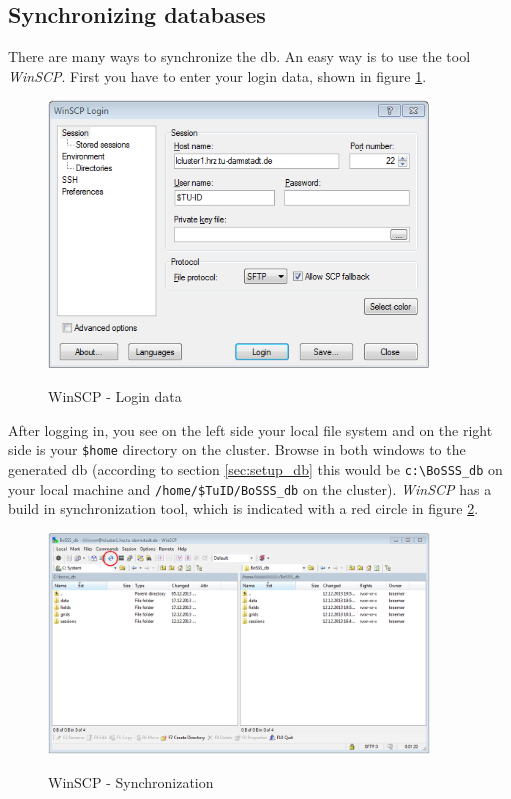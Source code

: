 \documentclass[11pt,twoside,a4paper]{fdyartcl}
\begin{document}
\subsection{Synchronizing databases}
\label{sec:synchronize_db}
There are many ways to synchronize the db. An easy way is to use the tool \emph{WinSCP}. First you have to enter your login data, shown in figure \ref{fig:winscp_login}.
\begin{figure}[htbp] %
  \begin{centering}
  \includegraphics[width=0.9\textwidth]{Figures/winscp_login.png}\\
  \end{centering}
  \caption{WinSCP - Login data}\label{fig:winscp_login}
\end{figure} %
After logging in, you see on the left side your local file system and on the right side is your \verb|$home| directory on the cluster. Browse in both windows to the generated db (according to section \ref{sec:setup_db} this would be \verb|c:\BoSSS_db| on your local machine and \verb|/home/$TuID/BoSSS_db| on the cluster). \emph{WinSCP} has a build in synchronization tool, which is indicated with a red circle in figure \ref{fig:winscp_sync}.
\begin{figure}[htbp] %
  \begin{centering}
  \includegraphics[width=0.9\textwidth]{Figures/winscp_sync.png}\\
  \end{centering}
  \caption{WinSCP - Synchronization}\label{fig:winscp_sync}
\end{figure} %
\end{document}
